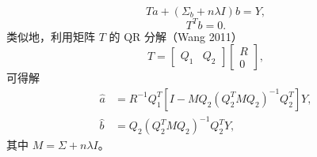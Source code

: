\begin{equation}
Ta+(\Sigma_b+n\lambda I)b=Y,\tag{2.A.102}
\end{equation}
\begin{equation}
T^Tb=0.\tag{2.A.103}
\end{equation}
类似地，利用矩阵 $T$ 的 QR 分解（Wang 2011）
\[
T=\begin{bmatrix}Q_1&Q_2\end{bmatrix}\begin{bmatrix}R\\0\end{bmatrix},
\]
可得解
\begin{equation}
\begin{aligned}
\widehat a&=R^{-1}Q_1^T
 \left[I-MQ_2(Q_2^TMQ_2)^{-1}Q_2^T\right]Y,\\
\widehat b&=Q_2(Q_2^TMQ_2)^{-1}Q_2^TY,
\end{aligned}\tag{2.A.104}
\end{equation}
其中 $M=\Sigma+n\lambda I$。
